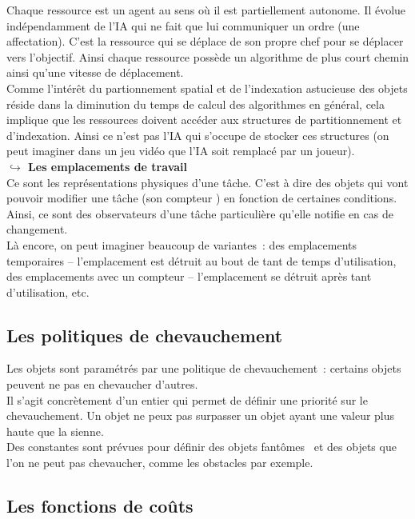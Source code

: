 Chaque ressource est un agent au sens où il est partiellement autonome. Il évolue indé\-pendamment de l'IA qui ne fait que lui communiquer un ordre (une affectation). C'est la ressource qui se déplace de son propre chef pour se déplacer vers l'objectif. Ainsi chaque ressource possède un algorithme de plus court chemin ainsi qu'une vitesse de déplacement.\\

Comme l'intérêt du partionnement spatial et de l'indexation astucieuse des objets réside dans la diminution du temps de calcul des algorithmes en général, cela implique que les ressources doivent accéder aux structures de partitionnement et d'indexation. Ainsi ce n'est pas l'IA qui s'occupe de stocker ces structures (on peut imaginer dans un jeu vidéo que l'IA soit remplacé par un joueur).\\

\textbf{$\hookrightarrow$ Les emplacements de travail}\\

Ce sont les représentations physiques d'une tâche. C'est à dire des objets qui vont pouvoir modifier une tâche (son \og compteur \fg ) en fonction de certaines conditions.\\
\indent Ainsi, ce sont des observateurs d'une tâche particulière qu'elle notifie en cas de changement.\\

Là encore, on peut imaginer beaucoup de variantes~: des emplacements temporaires – l'emplacement est détruit au bout de tant de temps d'utilisation, des emplacements avec un compteur – l'emplacement se détruit après tant d'utilisation, etc.

\subsection{Les politiques de chevauchement}

Les objets sont paramétrés par une politique de chevauchement~: certains objets peuvent ne pas en chevaucher d'autres.\\
\indent Il s'agit concrètement d'un entier qui permet de définir une priorité sur le chevauchement. Un objet ne peux pas surpasser un objet ayant une valeur plus haute que la sienne.\\
\indent Des constantes sont prévues pour définir des objets \og fantômes \fg ~et des objets que l'on ne peut pas chevaucher, comme les obstacles par exemple.

\subsection{Les fonctions de coûts}

